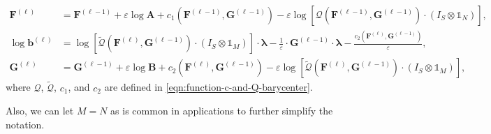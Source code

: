 \begin{update}\label{update:log-barycenter}
  \begin{equation*}
    \begin{aligned}
      \mathbf{F}^{(\ell)}
       & =
      \mathbf{F}^{(\ell-1)} + \varepsilon \log \mathbf{A} + c_1 \left(\mathbf{F}^{(\ell-1)}, \mathbf{G}^{(\ell-1)}\right)
      - \varepsilon \log\left[
        \mathcal{Q} \left(\mathbf{F}^{(\ell-1)}, \mathbf{G}^{(\ell-1)}\right)
        \cdot \left(I_S \otimes \mathbb{1}_N\right)
      \right],                                                                         \\
      \log \mathbf{b}^{(\ell)}
       & = \log\left[
        \widetilde{\mathcal{Q}} \left(\mathbf{F}^{(\ell)}, \mathbf{G}^{(\ell-1)}\right)
        \cdot \left(I_S \otimes \mathbb{1}_M\right)
        \right]
      \cdot \boldsymbol\lambda
      - \frac1\varepsilon \cdot \mathbf{G}^{(\ell-1)} \cdot \boldsymbol \lambda
      - \frac{c_2 \left(\mathbf{F}^{(\ell)}, \mathbf{G}^{(\ell-1)}\right)}\varepsilon, \\
      \mathbf{G}^{(\ell)}
       & =
      \mathbf{G}^{(\ell-1)}
      + \varepsilon \log \mathbf{B}
      + c_2 \left(\mathbf{F}^{(\ell)}, \mathbf{G}^{(\ell-1)}\right)
      - \varepsilon \log \left[
        \widetilde{\mathcal{Q}} \left(\mathbf{F}^{(\ell)}, \mathbf{G}^{(\ell-1)}\right)
        \cdot \left(I_S \otimes \mathbb{1}_M\right)
        \right],
    \end{aligned}
  \end{equation*}
  where $\mathcal{Q}$, $\widetilde{\mathcal{Q}}$, $c_1$, and $c_2$ are defined in \cref{eqn:function-c-and-Q-barycenter}.
\end{update}

Also, we can let $M = N$ as is common in applications to further simplify the notation.

